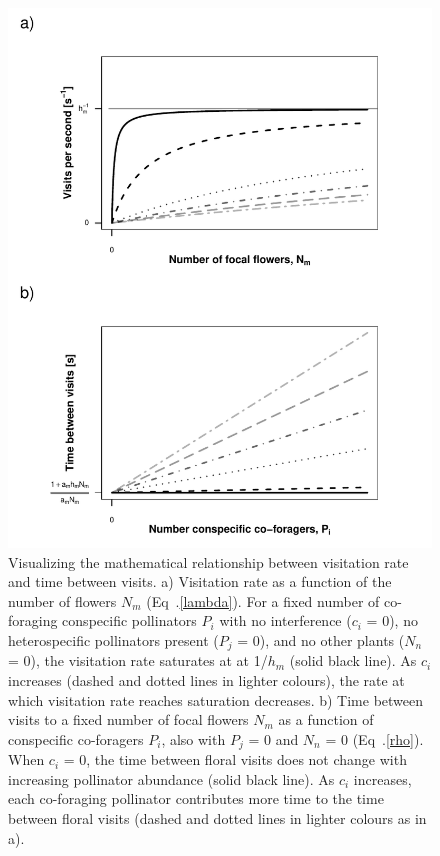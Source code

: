 \begin{refsection}
\begin{figure}[H]
    \centerline{\includegraphics[height=0.7\textheight]{figures/chapter2_fig1.pdf}}
    \caption[Visualizing the mathematical relationship between visitation rate and time between visits.]{Visualizing the mathematical relationship between visitation rate and time between visits. a) Visitation rate as a function of the number of flowers $N_{m}$ (Eq~.\ref{lambda}). For a fixed number of co-foraging conspecific pollinators $P_{i}$ with no interference ($c_{i}$ = 0), no heterospecific pollinators present ($P_{j}$ = 0), and no other plants ($N_{n}$ = 0), the visitation rate saturates at at 1/$h_{m}$ (solid black line). As $c_{i}$ increases (dashed and dotted lines in lighter colours), the rate at which visitation rate reaches saturation decreases. b) Time between visits to a fixed number of focal flowers $N_{m}$ as a function of conspecific co-foragers $P_{i}$, also with $P_{j}$ = 0 and $N_{n}$ = 0 (Eq~.\ref{rho}). When $c_{i}$ = 0, the time between floral visits does not change with increasing pollinator abundance (solid black line). As $c_{i}$ increases, each co-foraging pollinator contributes more time to the time between floral visits (dashed and dotted lines in lighter colours as in a). }
    \label{fig:fig1}
\end{figure}


\end{refsection}

